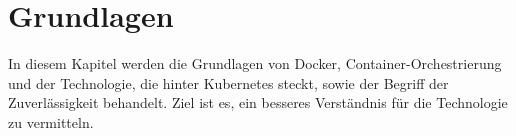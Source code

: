 \chapter{Grundlagen}

In diesem Kapitel werden die Grundlagen von Docker, Container-Orchestrierung und der Technologie, die hinter Kubernetes steckt, sowie der Begriff der Zuverlässigkeit behandelt.
Ziel ist es, ein besseres Verständnis für die Technologie zu vermitteln.





